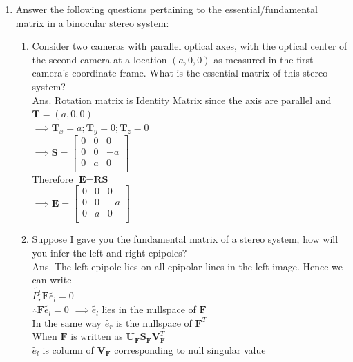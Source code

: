 \documentclass[11pt]{article}
\begin{document}
\maketitle


\begin{enumerate}
\item Answer the following questions pertaining to the essential/fundamental matrix in a binocular stereo system:
\begin{enumerate}
\item Consider two cameras with parallel optical axes, with the optical center of the second camera at a location $(a,0,0)$ as measured in the first camera's coordinate frame. What is the essential matrix of this stereo system? \\
Ans. Rotation matrix is Identity Matrix since the axis are parallel and $\textbf{T} = (a,0,0)$ \\
$\implies \textbf{T}_x = a; \textbf{T}_y = 0; \textbf{T}_z = 0$\\
$\implies \textbf{S} = \begin{bmatrix}
0 &0 &0\\
0 &0 &-a\\
0 &a &0\\
\end{bmatrix}$\\
Therefore $\textbf{E} = \textbf{R}\textbf{S}$\\
$\implies \textbf{E} = \begin{bmatrix}
0 &0 &0\\
0 &0 &-a\\
0 &a &0\\
\end{bmatrix}$
\item Suppose I gave you the fundamental matrix of a stereo system, how will you infer the left and right epipoles?\\
Ans.  The left epipole lies on all epipolar lines in the
left image. Hence we can write\\
$\tilde{P_r^t}\textbf{F}\tilde{e_l} = 0$\\
$\therefore \textbf{F}\tilde{e_l} =0$
$\implies \tilde{e_l}$ lies in the nullspace of $\textbf{F}$\\
In the same way $\tilde{e_r}$ is the nullspace of $\textbf{F}^T$\\
When $\textbf{F}$ is written as $ \textbf{U}_\textbf{F}\textbf{S}_\textbf{F}\textbf{V}_\textbf{F}^T$\\
$\tilde{e_l}$ is column of $\textbf{V}_\textbf{F}$ corresponding to null singular value\\ 

\end{enumerate}
\end{enumerate}
\end{document}

